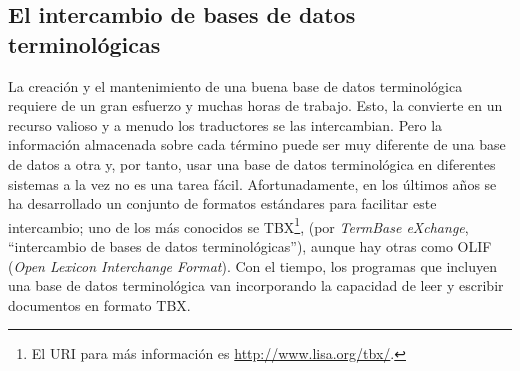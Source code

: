 \subsection{El intercambio de bases de datos terminológicas} \label{s3:tbx} 

La creación y el mantenimiento de una buena base de datos terminológica requiere de un gran esfuerzo y muchas horas de trabajo. Esto, la convierte en un recurso valioso y a menudo los traductores se las intercambian. Pero la información almacenada sobre cada término puede ser muy diferente de una base de datos a otra y, por tanto, usar una base de datos terminológica en diferentes sistemas a la vez no es una tarea fácil. Afortunadamente, en los últimos años se ha desarrollado un conjunto de formatos estándares para facilitar este intercambio; uno de los más conocidos se TBX\footnote{El URI para más información es \url{http://www.lisa.org/tbx/}.}, (por \emph{TermBase eXchange}, ``intercambio de bases de datos terminológicas''), aunque hay otras como OLIF (\emph{Open Lexicon Interchange Format}). Con el tiempo, los programas que incluyen una base de datos terminológica van incorporando la capacidad de leer y escribir documentos en formato TBX. 

